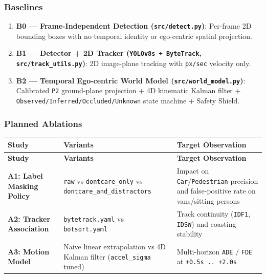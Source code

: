 \documentclass[10.5pt,a4paper]{article}
\begin{document}
\subsubsection{Baselines}
\begin{enumerate}[leftmargin=1.8em,itemsep=2pt]
\item \textbf{B0 --- Frame-Independent Detection (\texttt{src/\allowbreak{}detect.\allowbreak{}py})}: Per-frame 2D bounding boxes with no temporal identity or ego-centric spatial projection.
\item \textbf{B1 --- Detector + 2D Tracker (\texttt{YOLOv8s + ByteTrack}, \texttt{src/\allowbreak{}track\_\allowbreak{}utils.\allowbreak{}py})}: 2D image-plane tracking with \texttt{px/\allowbreak{}sec} velocity only.
\item \textbf{B2 --- Temporal Ego-centric World Model (\texttt{src/\allowbreak{}world\_\allowbreak{}model.\allowbreak{}py})}: Calibrated \texttt{P2} ground-plane projection + 4D kinematic Kalman filter + \texttt{Observed/\allowbreak{}Inferred/\allowbreak{}Occluded/\allowbreak{}Unknown} state machine + Safety Shield.
\end{enumerate}

\subsubsection{Planned Ablations}

\begin{footnotesize}
\setlength{\tabcolsep}{4pt}
\setlength{\LTleft}{0pt}\setlength{\LTright}{0pt}
\begin{longtable}{>{\raggedright\arraybackslash}p{} >{\raggedright\arraybackslash}p{} >{\raggedright\arraybackslash}p{}}
\toprule
\textbf{Study} & \textbf{Variants} & \textbf{Target Observation} \\
\midrule
\endfirsthead
\toprule
\textbf{Study} & \textbf{Variants} & \textbf{Target Observation} \\
\midrule
\endhead
\bottomrule
\endfoot
\textbf{A1: Label Masking Policy} & \texttt{raw} vs \texttt{dontcare\_\allowbreak{}only} vs \texttt{dontcare\_\allowbreak{}and\_\allowbreak{}distractors} & Impact on \texttt{Car}/\texttt{Pedestrian} precision and false-positive rate on vans/sitting persons \\
\textbf{A2: Tracker Association} & \texttt{bytetrack.\allowbreak{}yaml} vs \texttt{botsort.\allowbreak{}yaml} & Track continuity (\texttt{IDF1}, \texttt{IDSW}) and coasting stability \\
\textbf{A3: Motion Model} & Naive linear extrapolation vs 4D Kalman filter (\texttt{accel\_\allowbreak{}sigma} tuned) & Multi-horizon \texttt{ADE} / \texttt{FDE} at \texttt{+0.\allowbreak{}5s .\allowbreak{}.\allowbreak{} +2.\allowbreak{}0s} \\
\end{longtable}
\end{footnotesize}
\end{document}
